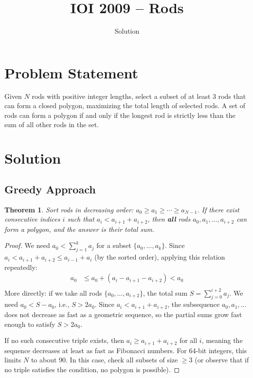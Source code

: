 \documentclass[11pt,a4paper]{article}
\title{IOI 2009 -- Rods}
\author{Solution}
\date{}
\newtheorem{theorem}{Theorem}
\begin{document}
\maketitle

\section{Problem Statement}
Given $N$ rods with positive integer lengths, select a subset of at least 3 rods that can form a closed polygon, maximizing the total length of selected rods. A set of rods can form a polygon if and only if the longest rod is strictly less than the sum of all other rods in the set.

\section{Solution}

\subsection{Greedy Approach}
\begin{theorem}
Sort rods in decreasing order: $a_0 \ge a_1 \ge \cdots \ge a_{N-1}$. If there exist consecutive indices $i$ such that $a_i < a_{i+1} + a_{i+2}$, then \textbf{all} rods $a_0, a_1, \ldots, a_{i+2}$ can form a polygon, and the answer is their total sum.
\end{theorem}

\begin{proof}
We need $a_0 < \sum_{j=1}^{k} a_j$ for a subset $\{a_0, \ldots, a_k\}$. Since $a_i < a_{i+1} + a_{i+2} \le a_{i-1} + a_i$ (by the sorted order), applying this relation repeatedly:
\begin{align*}
a_0 &\le a_0 + (a_i - a_{i+1} - a_{i+2}) < a_0 \\
\end{align*}
More directly: if we take all rods $\{a_0, \ldots, a_{i+2}\}$, the total sum $S = \sum_{j=0}^{i+2} a_j$. We need $a_0 < S - a_0$, i.e., $S > 2a_0$. Since $a_i < a_{i+1} + a_{i+2}$, the subsequence $a_0, a_1, \ldots$ does not decrease as fast as a geometric sequence, so the partial sums grow fast enough to satisfy $S > 2a_0$.

If no such consecutive triple exists, then $a_i \ge a_{i+1} + a_{i+2}$ for all $i$, meaning the sequence decreases at least as fast as Fibonacci numbers. For 64-bit integers, this limits $N$ to about 90. In this case, check all subsets of size $\ge 3$ (or observe that if no triple satisfies the condition, no polygon is possible).
\end{proof}
\end{document}
